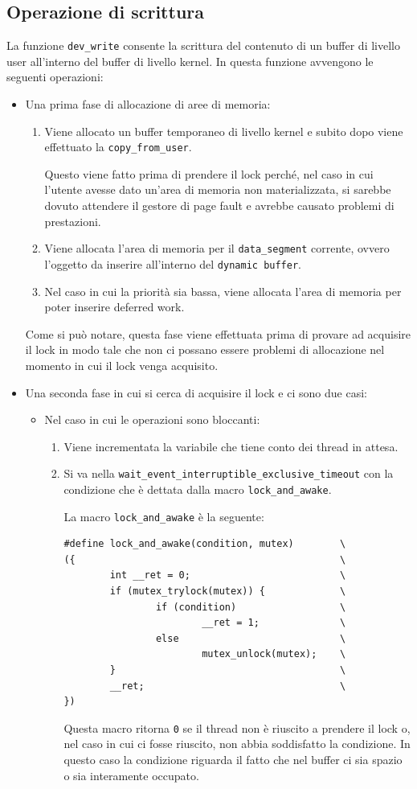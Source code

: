\documentclass[oneside]{article}
\begin{document}
\subsection{Operazione di scrittura}
La funzione \texttt{dev\_write} consente la scrittura del contenuto di un buffer di livello user all'interno del buffer di livello kernel. In questa funzione avvengono le seguenti operazioni:
\begin{itemize}
\item Una prima fase di allocazione di aree di memoria:
\begin{enumerate}
\item Viene allocato un buffer temporaneo di livello kernel e subito dopo viene effettuato la \texttt{copy\_from\_user}.

Questo viene fatto prima di prendere il lock perché, nel caso in cui l'utente avesse dato un'area di memoria non materializzata, si sarebbe dovuto attendere il gestore di page fault e avrebbe causato problemi di prestazioni.
\item Viene allocata l'area di memoria per il \texttt{data\_segment} corrente, ovvero l'oggetto da inserire all'interno del \texttt{dynamic buffer}.
\item Nel caso in cui la priorità sia bassa, viene allocata l'area di memoria per poter inserire deferred work.
\end{enumerate}
Come si può notare, questa fase viene effettuata prima di provare ad acquisire il lock in modo tale che non ci possano essere problemi di allocazione nel momento in cui il lock venga acquisito.
\item Una seconda fase in cui si cerca di acquisire il lock e ci sono due casi:
\begin{itemize}
\item Nel caso in cui le operazioni sono bloccanti:
\begin{enumerate}
\item Viene incrementata la variabile che tiene conto dei thread in attesa.
\item Si va nella \texttt{wait\_event\_interruptible\_exclusive\_timeout} con la condizione che è dettata dalla macro \texttt{lock\_and\_awake}.

La macro \texttt{lock\_and\_awake} è la seguente:
\begin{lstlisting}[caption={Macro \texttt{lock\_and\_awake}},label={macrolock}]
#define lock_and_awake(condition, mutex)		\
({												\
        int __ret = 0;							\
        if (mutex_trylock(mutex)) {             \
                if (condition)                  \
                        __ret = 1;              \
                else                            \
                        mutex_unlock(mutex);    \
        }                                       \
        __ret;                                  \
})
\end{lstlisting}
Questa macro ritorna \texttt{0} se il thread non è riuscito a prendere il lock o, nel caso in cui ci fosse riuscito, non abbia soddisfatto la condizione. In questo caso la condizione riguarda il fatto che nel buffer ci sia spazio o sia interamente occupato.


\end{enumerate}
\end{itemize}
\end{itemize}
\end{document}
